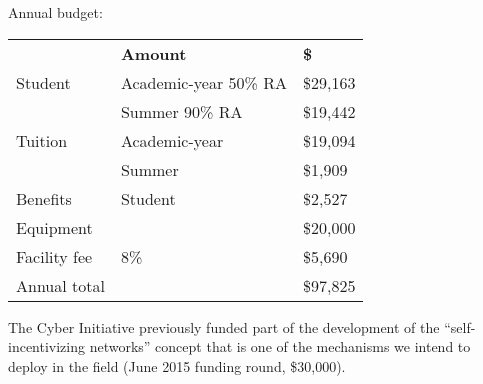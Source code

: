 \documentclass[11pt]{article}
\newcommand{\slim}{\vspace{\baselineskip}}
\begin{document}
\slim

\noindent Annual budget:

\slim

\noindent \begin{tabular}{ll|l}
& \bf Amount & \bf \$ \\
Student & Academic-year 50\% RA & \$29,163 \\
        & Summer 90\% RA & \$19,442 \\

Tuition & Academic-year & \$19,094 \\
        & Summer        & \$1,909 \\

Benefits & Student & \$2,527 \\

Equipment &         & \$20,000 \\

\hline

Facility fee & 8\% & \$5,690 \\
Annual total & & \$97,825 \\

\end{tabular}

\slim

The Cyber Initiative previously funded part of the development of the
``self-incentivizing networks'' concept that is one of the mechanisms
we intend to deploy in the field (June 2015 funding round, \$30,000).

{\footnotesize



}
\end{document}
